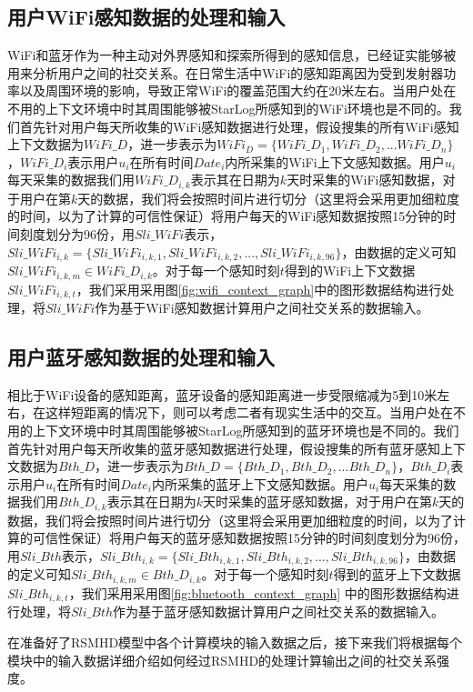 \subsection{用户WiFi感知数据的处理和输入}
\label{sec:wifi_input}
WiFi和蓝牙作为一种主动对外界感知和探索所得到的感知信息，已经证实能够被用来分析用户之间的社交关系。在日常生活中WiFi的感知距离因为受到发射器功率以及周围环境的影响，导致正常WiFi的覆盖范围大约在20米左右。当用户处在不用的上下文环境中时其周围能够被StarLog所感知到的WiFi环境也是不同的。我们首先针对用户每天所收集的WiFi感知数据进行处理，假设搜集的所有WiFi感知上下文数据为$WiFi\_D$，进一步表示为$WiFi_D=\{  WiFi\_D_{1},WiFi\_D_{2},...WiFi\_D_{n}  \}$，$WiFi\_D_{i}$表示用户$u_{i}$在所有时间$Date_{i}$内所采集的WiFi上下文感知数据。用户$u_{i}$每天采集的数据我们用$WiFi\_D_{i,k}$表示其在日期为$k$天时采集的WiFi感知数据，对于用户在第$k$天的数据，我们将会按照时间片进行切分（这里将会采用更加细粒度的时间，以为了计算的可信性保证）将用户每天的WiFi感知数据按照15分钟的时间刻度划分为96份，用$Sli\_WiFi$表示，$Sli\_WiFi_{i,k}=\{Sli\_WiFi_{i,k,1},Sli\_WiFi_{i,k,2},...,Sli\_WiFi_{i,k,96}\}$，由数据的定义可知$Sli\_WiFi_{i,k,m} \in WiFi\_D_{i,k}$。对于每一个感知时刻$t$得到的WiFi上下文数据$Sli\_WiFi_{i,k,t}$，我们采用采用图\ref{fig:wifi_context_graph}中的图形数据结构进行处理，将$Sli\_WiFi$作为基于WiFi感知数据计算用户之间社交关系的数据输入。
\subsection{用户蓝牙感知数据的处理和输入}
\label{sec:bl_input}
相比于WiFi设备的感知距离，蓝牙设备的感知距离进一步受限缩减为5到10米左右，在这样短距离的情况下，则可以考虑二者有现实生活中的交互。当用户处在不用的上下文环境中时其周围能够被StarLog所感知到的蓝牙环境也是不同的。我们首先针对用户每天所收集的蓝牙感知数据进行处理，假设搜集的所有蓝牙感知上下文数据为$Bth\_D$，进一步表示为$Bth\_D=\{Bth\_D_{1},Bth\_D_{2},...Bth\_D_{n} \}$，$Bth\_D_{i}$表示用户$u_{i}$在所有时间$Date_{i}$内所采集的蓝牙上下文感知数据。用户$u_{i}$每天采集的数据我们用$Bth\_D_{i,k}$表示其在日期为$k$天时采集的蓝牙感知数据，对于用户在第$k$天的数据，我们将会按照时间片进行切分（这里将会采用更加细粒度的时间，以为了计算的可信性保证）将用户每天的蓝牙感知数据按照15分钟的时间刻度划分为96份，用$Sli\_Bth$表示，$Sli\_Bth_{i,k}=\{Sli\_Bth_{i,k,1},Sli\_Bth_{i,k,2},...,Sli\_Bth_{i,k,96}\}$，由数据的定义可知$Sli\_Bth_{i,k,m} \in Bth\_D_{i,k}$。对于每一个感知时刻$t$得到的蓝牙上下文数据$Sli\_Bth_{i,k,t}$，我们采用采用图\ref{fig:bluetooth_context_graph} 中的图形数据结构进行处理，将$Sli\_Bth$作为基于蓝牙感知数据计算用户之间社交关系的数据输入。
\par 在准备好了RSMHD模型中各个计算模块的输入数据之后，接下来我们将根据每个模块中的输入数据详细介绍如何经过RSMHD的处理计算输出之间的社交关系强度。
